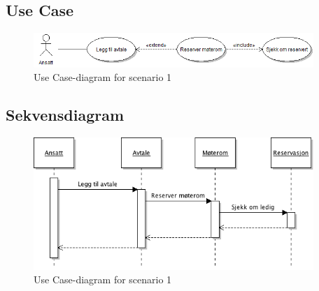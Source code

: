 \subsection{Use Case}
\begin{figure}[H]
\label{fig:uc1}
\includegraphics[width=400px]{ucs1.png}
\caption{Use Case-diagram for scenario 1}
\end{figure}

\subsection{Sekvensdiagram}
\begin{figure}[H]
\label{fig:sek1}
\includegraphics[width=400px]{sekvens1.png}
\caption{Use Case-diagram for scenario 1}
\end{figure}